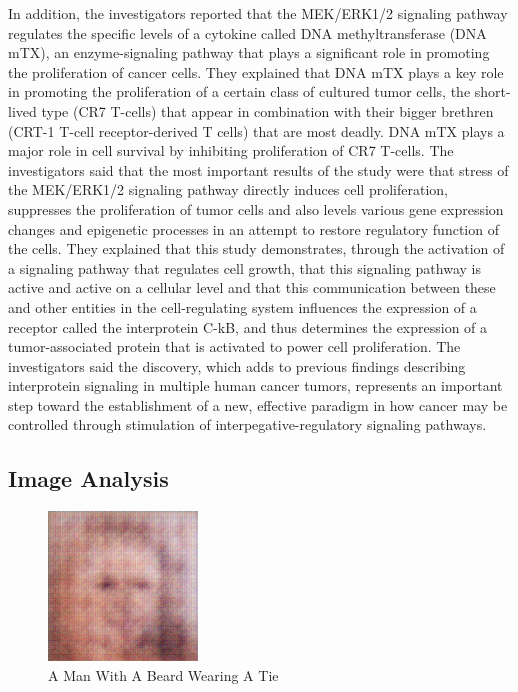 \documentclass{article}%
\begin{document}
In addition, the investigators reported that the MEK/ERK1/2 signaling pathway regulates the specific levels of a cytokine called DNA methyltransferase (DNA mTX), an enzyme{-}signaling pathway that plays a significant role in promoting the proliferation of cancer cells. They explained that DNA mTX plays a key role in promoting the proliferation of a certain class of cultured tumor cells, the short{-}lived type (CR7 T{-}cells) that appear in combination with their bigger brethren (CRT{-}1 T{-}cell receptor{-}derived T cells) that are most deadly. DNA mTX plays a major role in cell survival by inhibiting proliferation of CR7 T{-}cells.\newline%
The investigators said that the most important results of the study were that stress of the MEK/ERK1/2 signaling pathway directly induces cell proliferation, suppresses the proliferation of tumor cells and also levels various gene expression changes and epigenetic processes in an attempt to restore regulatory function of the cells. They explained that this study demonstrates, through the activation of a signaling pathway that regulates cell growth, that this signaling pathway is active and active on a cellular level and that this communication between these and other entities in the cell{-}regulating system influences the expression of a receptor called the interprotein C{-}kB, and thus determines the expression of a tumor{-}associated protein that is activated to power cell proliferation. The investigators said the discovery, which adds to previous findings describing interprotein signaling in multiple human cancer tumors, represents an important step toward the establishment of a new, effective paradigm in how cancer may be controlled through stimulation of interpegative{-}regulatory signaling pathways.

%
\subsection{Image Analysis}%
\label{subsec:ImageAnalysis}%


\begin{figure}[h!]%
\centering%
\includegraphics[width=150px]{500_fake_images/samples_5_277.png}%
\caption{A Man With A Beard Wearing A Tie}%
\end{figure}

%
\end{document}
